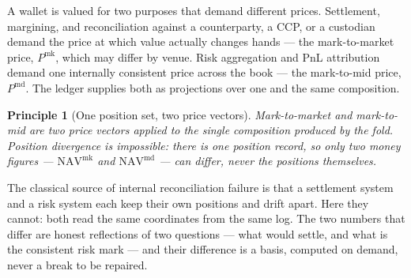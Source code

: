 \documentclass[11pt,a4paper]{article}
\newtheorem{principle}[definition]{Principle}
\begin{document}
A wallet is valued for two purposes that demand different prices. Settlement,
margining, and reconciliation against a counterparty, a CCP, or a custodian
demand the price at which value actually changes hands --- the mark-to-market
price, $P^{\mathrm{mk}}$, which may differ by venue. Risk aggregation and PnL
attribution demand one internally consistent price across the book --- the
mark-to-mid price, $P^{\mathrm{md}}$. The ledger supplies both as projections
over one and the same composition.

\begin{principle}[One position set, two price vectors]
Mark-to-market and mark-to-mid are two price vectors applied to the single
composition produced by the fold. Position divergence is impossible: there is
one position record, so only two money figures --- $\mathrm{NAV}^{\mathrm{mk}}$
and $\mathrm{NAV}^{\mathrm{md}}$ --- can differ, never the positions
themselves.
\end{principle}

The classical source of internal reconciliation failure is that a settlement
system and a risk system each keep their own positions and drift apart. Here
they cannot: both read the same coordinates from the same log. The two numbers
that differ are honest reflections of two questions --- what would settle, and
what is the consistent risk mark --- and their difference is a basis, computed
on demand, never a break to be repaired.
\end{document}
